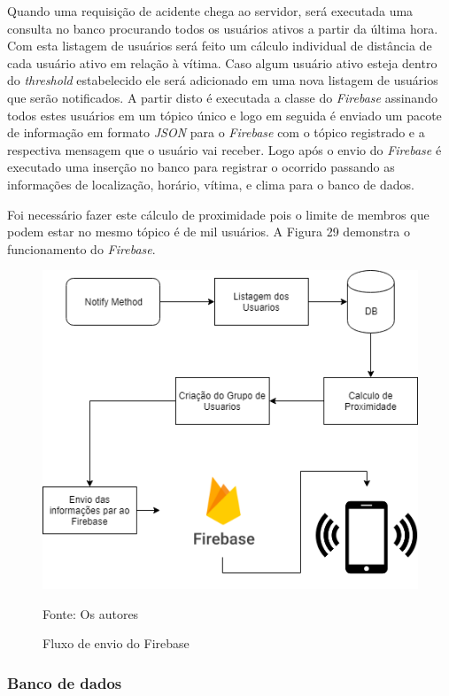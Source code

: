 Quando uma requisição de acidente chega ao  servidor, será executada uma consulta no banco procurando todos os usuários ativos a partir da última hora. Com esta listagem de usuários será feito um cálculo individual de distância de cada usuário ativo em relação à vítima. Caso algum usuário ativo esteja dentro do \textit{threshold} estabelecido ele será adicionado em uma nova listagem de usuários que serão notificados. A partir disto é executada a classe do \textit{Firebase} assinando todos estes usuários em um tópico único e logo em seguida é enviado um pacote de informação em formato \textit{JSON} para o \textit{Firebase} com o tópico registrado e a respectiva mensagem que o usuário vai receber. Logo após o envio do \textit{Firebase} é executado uma inserção no banco para registrar o ocorrido passando as informações de localização, horário, vítima, e clima para o banco de dados.

Foi necessário fazer este cálculo de proximidade pois o limite de membros que podem estar no mesmo tópico é de mil  usuários. A Figura 29 demonstra o funcionamento do \textit{Firebase}.

 \begin{figure}[H]

\begin{center}
     \caption{Fluxo de envio do Firebase }
  \includegraphics[width=120mm]{images/Cap4/cap_4_firebase_fluxo.png}
\end{center}
 \scriptsize Fonte: Os autores
  
\end{figure}


\subsubsection{Banco de dados}

